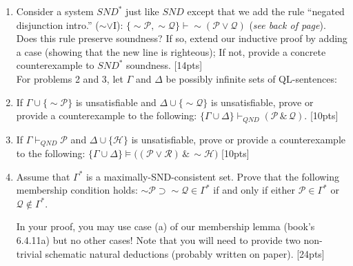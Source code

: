 \documentclass[12pt]{article}
\def\eor{\ensuremath{\vee}}
\def\eand{\ensuremath{\,\&\,}}
\def\eif{\ensuremath{\supset}}
\def\enot{\ensuremath{{\sim}}} %
\let\oldsim\sim %
\renewcommand{\sim}{{\oldsim}} %
\newcommand*{\metav}[1]{\ensuremath{\mathcal{#1}}}
\begin{document}
\begin{enumerate}
\item 
Consider a system $\mathit{SND}^*$ just like  $\mathit{SND}$ except that we add the rule ``negated disjunction intro.'' (\enot \eor I): $\{ \enot \metav{P}, \enot \metav{Q} \} \vdash \enot (\metav{P} \eor \metav{Q})$ (\textit{see back of page}). Does this rule preserve soundness? If so, extend our inductive proof by adding a case (showing that the new line is righteous); If not, provide a concrete counterexample to $\mathit{SND}^*$ soundness. [14pts] \\

For problems 2 and 3, let $\Gamma$ and $\Delta$ be possibly infinite sets of QL-sentences:

\item If $\Gamma \cup \{ \enot \metav{P} \}$ is unsatisfiable and $\Delta \cup \{ \enot \metav{Q} \}$ is unsatisfiable, prove or provide a counterexample to the following: $\{ \Gamma \cup\Delta \} \vdash_{\mathit{QND}} (\metav{P} \eand \metav{Q})$. [10pts]

\item If $\Gamma \vdash_{\mathit{QND}} \metav{P}$ and $\Delta \cup\{\metav{H}\}$ is unsatisfiable, prove or provide a counterexample to the following: $\{ \Gamma \cup \Delta \} \vDash \big( (\metav{P} \eor \metav{R}) \eand \enot \metav{H} \big) $ [10pts] \\


\item Assume that $\Gamma^{\ast}$ is a maximally-SND-consistent set. Prove that the following membership condition holds: $\enot \metav{P} \eif \enot \metav{Q} \in \Gamma^{\ast}$ if and only if either $\metav{P}\in \Gamma^{\ast}$ or $\metav{Q}\notin \Gamma^{\ast}$. 

In your proof, you may use case (a) of our membership lemma (book's 6.4.11a) but no other cases! Note that you will need to provide two non-trivial schematic natural deductions (probably written on paper). [24pts] \\



\end{enumerate}
\end{document}
